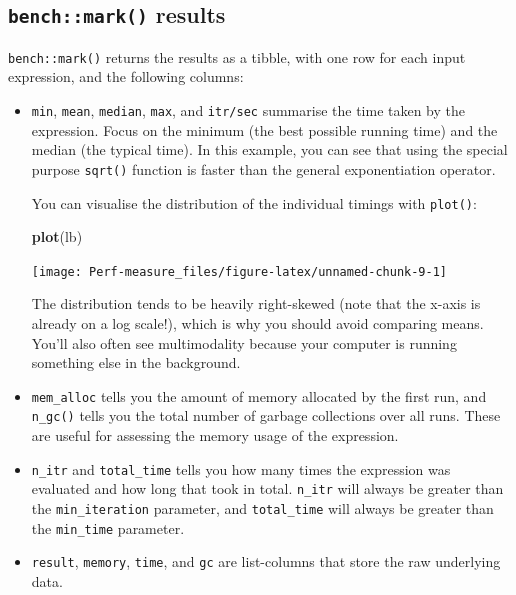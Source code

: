 \documentclass[]{book}
\makeatletter
\newenvironment{Shaded}{\begin{snugshade}}{\end{snugshade}}
\newcommand{\KeywordTok}[1]{\textcolor[rgb]{0.27,0.27,0.27}{\textbf{#1}}}
\newcommand{\NormalTok}[1]{#1}
\newcommand{\indexc}[1]{\index{#1@\texttt{#1}}}
\makeatother
\begin{document}
\hypertarget{benchmark-results}{%
\subsection{\texorpdfstring{\texttt{bench::mark()} results}{bench::mark() results}}\label{benchmark-results}}

\indexc{mark()}

\texttt{bench::mark()} returns the results as a tibble, with one row for each input expression, and the following columns:

\begin{itemize}
\item
  \texttt{min}, \texttt{mean}, \texttt{median}, \texttt{max}, and \texttt{itr/sec} summarise the time taken by the
  expression. Focus on the minimum (the best possible running time) and the
  median (the typical time). In this example, you can see that using the
  special purpose \texttt{sqrt()} function is faster than the general exponentiation
  operator.

  You can visualise the distribution of the individual timings with \texttt{plot()}:

\begin{Shaded}
\begin{Highlighting}[]
\KeywordTok{plot}\NormalTok{(lb)}
\end{Highlighting}
\end{Shaded}

  \begin{center}\texttt{[image: Perf-measure\_files/figure-latex/unnamed-chunk-9-1]} \end{center}

  The distribution tends to be heavily right-skewed (note that the x-axis is
  already on a log scale!), which is why you should avoid comparing means.
  You'll also often see multimodality because your computer is running
  something else in the background.
\item
  \texttt{mem\_alloc} tells you the amount of memory allocated by the first run,
  and \texttt{n\_gc()} tells you the total number of garbage collections over all
  runs. These are useful for assessing the memory usage of the expression.
\item
  \texttt{n\_itr} and \texttt{total\_time} tells you how many times the expression was
  evaluated and how long that took in total. \texttt{n\_itr} will always be
  greater than the \texttt{min\_iteration} parameter, and \texttt{total\_time} will always
  be greater than the \texttt{min\_time} parameter.
\item
  \texttt{result}, \texttt{memory}, \texttt{time}, and \texttt{gc} are list-columns that store the
  raw underlying data.
\end{itemize}
\end{document}
